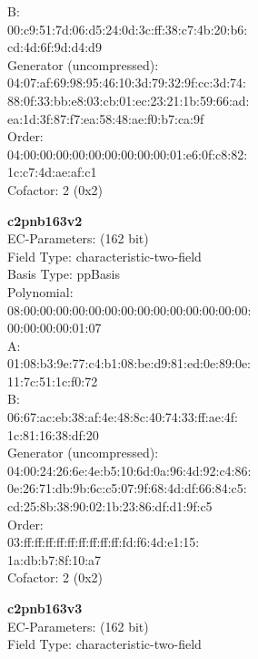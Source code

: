 B:   \\
    00:c9:51:7d:06:d5:24:0d:3c:ff:38:c7:4b:20:b6:\\
    cd:4d:6f:9d:d4:d9\\
Generator (uncompressed):\\
    04:07:af:69:98:95:46:10:3d:79:32:9f:cc:3d:74:\\
    88:0f:33:bb:e8:03:cb:01:ec:23:21:1b:59:66:ad:\\
    ea:1d:3f:87:f7:ea:58:48:ae:f0:b7:ca:9f\\
Order: \\
    04:00:00:00:00:00:00:00:00:00:01:e6:0f:c8:82:\\
    1c:c7:4d:ae:af:c1\\
Cofactor:  2 (0x2)\\
\item \textbf{ c2pnb163v2 }\\
EC-Parameters: (162 bit)\\
Field Type: characteristic-two-field\\
Basis Type: ppBasis\\
Polynomial:\\
    08:00:00:00:00:00:00:00:00:00:00:00:00:00:00:\\
    00:00:00:00:01:07\\
A:   \\
    01:08:b3:9e:77:c4:b1:08:be:d9:81:ed:0e:89:0e:\\
    11:7c:51:1c:f0:72\\
B:   \\
    06:67:ac:eb:38:af:4e:48:8c:40:74:33:ff:ae:4f:\\
    1c:81:16:38:df:20\\
Generator (uncompressed):\\
    04:00:24:26:6e:4e:b5:10:6d:0a:96:4d:92:c4:86:\\
    0e:26:71:db:9b:6c:c5:07:9f:68:4d:df:66:84:c5:\\
    cd:25:8b:38:90:02:1b:23:86:df:d1:9f:c5\\
Order: \\
    03:ff:ff:ff:ff:ff:ff:ff:ff:ff:fd:f6:4d:e1:15:\\
    1a:db:b7:8f:10:a7\\
Cofactor:  2 (0x2)\\
\item \textbf{ c2pnb163v3 }\\
EC-Parameters: (162 bit)\\
Field Type: characteristic-two-field\\
